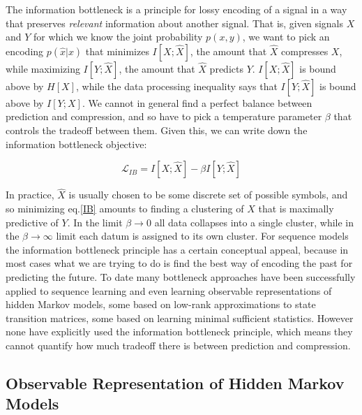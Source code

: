 \documentclass{article} %
\begin{document}
The information bottleneck is a principle for lossy encoding of a signal in a way that preserves {\em relevant} information about another signal.  That is, given signals $X$ and $Y$ for which we know the joint probability $p(x,y)$, we want to pick an encoding $p(\hat{x}|x)$ that minimizes $I[X;\hat{X}]$, the amount that $\hat{X}$ compresses $X$, while maximizing $I[Y;\hat{X}]$, the amount that $\hat{X}$ predicts $Y$.  $I[X;\hat{X}]$ is bound above by $H[X]$, while the data processing inequality says that $I[Y;\hat{X}]$ is bound above by $I[Y;X]$.  We cannot in general find a perfect balance between prediction and compression, and so have to pick a temperature parameter $\beta$ that controls the tradeoff between them.  Given this, we can write down the information bottleneck objective:

\begin{equation}
\mathcal{L}_{IB} = I[X;\hat{X}] - \beta I[Y;\hat{X}]
\label{IB}
\end{equation}

In practice, $\hat{X}$ is usually chosen to be some discrete set of possible symbols, and so minimizing eq.\ref{IB} amounts to finding a clustering of $X$ that is maximally predictive of $Y$.  In the limit $\beta\rightarrow 0$ all data collapses into a single cluster, while in the $\beta\rightarrow\infty$ limit each datum is assigned to its own cluster.  For sequence models the information bottleneck principle has a certain conceptual appeal, because in most cases what we are trying to do is find the best way of encoding the past for predicting the future.  To date many bottleneck approaches have been successfully applied to sequence learning and even learning observable representations of hidden Markov models, some based on low-rank approximations to state transition matrices, some based on learning minimal sufficient statistics.  However none have explicitly used the information bottleneck principle, which means they cannot quantify how much tradeoff there is between prediction and compression.

\subsection{Observable Representation of Hidden Markov Models}
\end{document}

